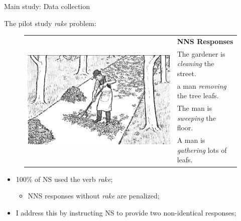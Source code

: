 \documentclass[handout,xcolor={dvipsnames}]{beamer}
\begin{document}
%


\begin{frame}{Main study: Data collection}

The pilot study \textit{rake} problem:


\begin{figure}[htb!]
\begin{center}
\bgroup
\def\arraystretch{1.25}
\begin{tabular}{|C{35mm}|C{65mm}|}
\hline
{} &
\textbf{NNS Responses} \\
& The gardener is \textit{cleaning} the street. \\
& a man \textit{removing} the tree leafs. \\
& The man is \textit{sweeping} the floor. \\
& A man is \textit{gathering} lots of leafs. \\
\hline
\end{tabular}
\egroup
\end{center}
\label{fig:pilot-raking}
\end{figure}

\begin{itemize}
\item 100\% of NS used the verb \textit{rake};
\begin{itemize}
\item NNS responses without \textit{rake} are penalized;
\end{itemize}
\item I address this by instructing NS to provide two non-identical responses;
\end{itemize}
\end{frame}
\end{document}
